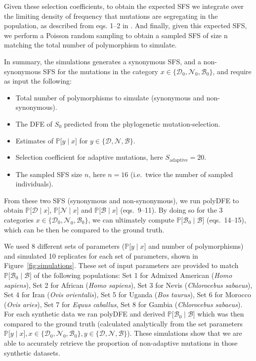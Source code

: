 \documentclass{article}
\newcommand{\proba}{\mathbb{P}}
\newcommand{\Sphy}{S_{0}}
\newcommand{\SphyDel}{\mathcal{D}_0}
\newcommand{\SphyNeu}{\mathcal{N}_0}
\newcommand{\SphyBen}{\mathcal{B}_0}
\newcommand{\given}{\mid}
\newcommand{\SpopDel}{\mathcal{D}}
\newcommand{\SpopNeu}{\mathcal{N}}
\newcommand{\SpopBen}{\mathcal{B}}
\begin{document}
    Given these selection coefficients, to obtain the expected SFS we integrate over the limiting density of frequency that mutations are segregating in the population, as described from eqs. 1--2 in \textcite{tataru_inference_2017}.
    And finally, given this expected SFS, we perform a Poisson random sampling to obtain a sampled SFS of size n matching the total number of polymorphism to simulate.

    In summary, the simulations generates a synonymous SFS, and a non-synonymous SFS for the mutations in the category $x \in \{ \SphyDel, \SphyNeu, \SphyBen \}$, and require as input the following:
    \begin{itemize}
        \item Total number of polymorphisms to simulate (synonymous and non-synonymous).
        \item The DFE of $\Sphy$ predicted from the phylogenetic mutation-selection.
        \item Estimates of $\proba{[}y \given x{]}$ for $y \in \{ \SpopDel, \SpopNeu, \SpopBen \}$.
        \item Selection coefficient for adaptive mutations, here $S_{\text{adaptive}}=20$.
        \item The sampled SFS size $n$, here $n=16$ (i.e.\ twice the number of sampled individuals).
    \end{itemize}

    From these two SFS (synonymous and non-synonymous), we run polyDFE to obtain $\proba{[}\SpopDel \given x{]}$, $\proba{[}\SpopNeu \given x{]}$ and $\proba{[}\SpopBen \given x{]}$ (eqs.\ 9--11).
    By doing so for the 3 categories $x \in \{ \SphyDel, \SphyNeu, \SphyBen \}$, we can ultimately compute $\proba{[}\SphyBen \given \SpopBen{]}$ (eqs.\ 14--15), which can be then be compared to the ground truth.

    We used 8 different sets of parameters ($\proba{[}y \given x{]}$ and number of polymorphisms) and simulated 10 replicates for each set of parameters, shown in Figure~\ref{fig:simulations}.
    These set of input parameters are provided to match $\proba{[}\SphyBen \given \SpopBen{]}$ of the following populations: Set 1 for Admixed American (\textit{Homo sapiens}), Set 2 for African (\textit{Homo sapiens}), Set 3 for Nevis (\textit{Chlorocebus sabaeus}), Set 4 for Iran (\textit{Ovis orientalis}), Set 5 for Uganda (\textit{Bos taurus}), Set 6 for Morocco (\textit{Ovis aries}), Set 7 for \textit{Equus caballus}, Set 8 for Gambia (\textit{Chlorocebus sabaeus}).
    For each synthetic data we ran polyDFE and derived $\proba{[}\SphyBen \given \SpopBen{]}$ which was then compared to the ground truth (calculated analytically from the set parameters $\proba{[}y \given x], x \in \{ \SphyDel, \SphyNeu, \SphyBen \}, y \in \{ \SpopDel, \SpopNeu, \SpopBen \}$).
    These simulations show that we are able to accurately retrieve the proportion of non-adaptive mutations in those synthetic datasets.
\end{document}
